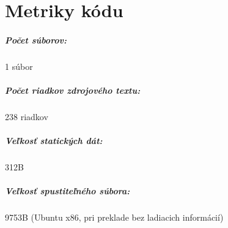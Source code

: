 \documentclass[12pt,a4paper,titlepage,final]{report}
\begin{document}
\appendix
\chapter{Metriky kódu} \label{metriky}
\paragraph{Počet súborov:} 1 súbor
\paragraph{Počet riadkov zdrojového textu:} 238 riadkov
\paragraph{Veľkosť statických dát:} 312B
\paragraph{Veľkosť spustiteľného súbora:} 9753B  (Ubuntu x86, pri preklade bez ladiacich informácií)
\end{document}
